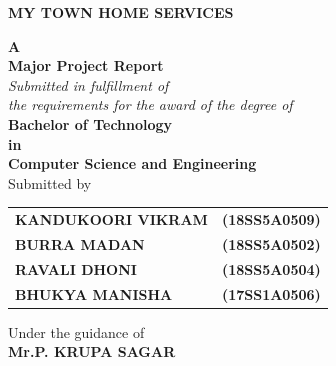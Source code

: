 \documentclass[12pt,a4paper]{report}
\begin{document}
\begin{titlepage}
\begin{center}
\begin{large}
			\textbf{\large  MY TOWN HOME SERVICES}\\[.75cm]
		\end{large}
		\textbf{ \large A}\\[.45cm]
		\textbf{ \large Major Project Report}\\[.45cm]		
		\textit{\large Submitted in fulfillment of\\ the requirements for the award of the degree of}\\[.6cm]
\textbf{\large  {Bachelor of Technology\\[.1cm] in}}\\[.1cm]
\textbf{\large {Computer Science and Engineering }}\\[.25cm]
\textup{\large Submitted by}\\[.25cm]
 \begin{table}[ht]
			\begin{center}
			       \begin{tabular}{l r}
				{\small \textbf{KANDUKOORI VIKRAM}} & {\small \textbf{(18SS5A0509)}}\\
				{\small \textbf{BURRA MADAN}} & {\small \textbf{(18SS5A0502)}}\\
				{\small \textbf{RAVALI DHONI}} & {\small \textbf{(18SS5A0504)}}\\
				{\small \textbf{BHUKYA MANISHA}} & {\small \textbf{(17SS1A0506)}}\\
			\end{tabular} 
			\end{center}{}
			
		\end{table}

\vspace{0.45cm}
\textup{{\large Under the guidance of}}\\
\textbf{{\large  Mr.P. KRUPA SAGAR}}\\
\begin{center}


\end{center}
\end{center}
\end{titlepage}
\end{document}
